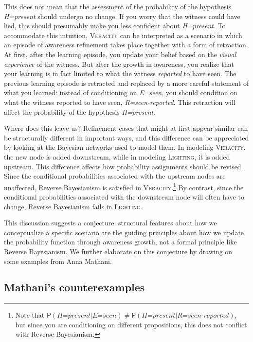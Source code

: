 \documentclass[
  11pt,
  dvipsnames,enabledeprecatedfontcommands]{scrartcl}
\newcommand{\pr}[1]{\ensuremath{\mathsf{P}(#1)}}
\begin{document}
This does not mean that the assessment of the probability of the
hypothesis \textit{H=present} should undergo no change. If you worry
that the witness could have lied, this should presumably make you less
confident about \textit{H=present}. To accommodate this intuition,
\textsc{Veracity} can be interpreted as a scenario in which an episode
of awareness refinement takes place together with a form of retraction.
At first, after the learning episode, you update your belief based on
the \textit{visual experience} of the witness. But after the growth in
awareness, you realize that your learning is in fact limited to what the
witness \textit{reported} to have seen. The previous learning episode is
retracted and replaced by a more careful statement of what you learned:
instead of conditioning on \textit{E=seen}, you should condition on what
the witness reported to have seen, \textit{R=seen-reported}. This
retraction will affect the probability of the hypothesis
\textit{H=present}.

Where does this leave us? Refinement cases that might at first appear
similar can be structurally different in important ways, and this
difference can be appreciated by looking at the Bayesian networks used
to model them. In modeling \textsc{Veracity}, the new node is added
downstream, while in modeling \textsc{Lighting}, it is added upstream.
This difference affects how probability assignments should be revised.
Since the conditional probabilities associated with the upstream nodes
are unaffected, Reverse Bayesianism is satisfied in
\textsc{Veracity}.\footnote{Note that
  \(\pr{\textit{H=present}\vert \textit{E=seen}}\neq \pr{\textit{H=present}\vert \textit{R=seen-reported}}\),
  but since you are conditioning on different propositions, this does
  not conflict with Reverse Bayesianism.} By contrast, since the
conditional probabilities associated with the downstream node will often
have to change, Reverse Bayesianism fails in \textsc{Lighting}.

This discussion suggests a conjecture: structural features about how we
conceptualize a specific scenario are the guiding principles about how
we update the probability function through awareness growth, not a
formal principle like Reverse Bayesianism. We further elaborate on this
conjecture by drawing on some examples from Anna Mathani.

\hypertarget{mathanis-counterexamples}{%
\subsection{Mathani's counterexamples}\label{mathanis-counterexamples}}
\end{document}
